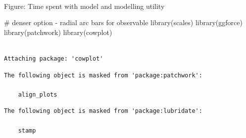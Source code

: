 \documentclass[
  letterpaper,
  DIV=11,
  numbers=noendperiod]{scrartcl}
\makeatletter
\let\oldparagraph\paragraph
\renewcommand{\paragraph}{
    \@ifstar
      \xxxParagraphStar
      \xxxParagraphNoStar
  }
\newcommand{\xxxParagraphStar}[1]{\oldparagraph*{#1}\mbox{}}
\newcommand{\xxxParagraphNoStar}[1]{\oldparagraph{#1}\mbox{}}
\newenvironment{Shaded}{\begin{snugshade}}{\end{snugshade}}
\newcommand{\CommentTok}[1]{\textcolor[rgb]{0.37,0.37,0.37}{#1}}
\newcommand{\FunctionTok}[1]{\textcolor[rgb]{0.28,0.35,0.67}{#1}}
\newcommand{\NormalTok}[1]{\textcolor[rgb]{0.00,0.23,0.31}{#1}}
\makeatother
\begin{document}
\paragraph{Figure: Time spent with model and modelling
utility}\label{figure-time-spent-with-model-and-modelling-utility}

\begin{Shaded}
\begin{Highlighting}[]
\CommentTok{\# denser option {-} radial arc bars for observable}
\FunctionTok{library}\NormalTok{(scales)}
\FunctionTok{library}\NormalTok{(ggforce)}
\FunctionTok{library}\NormalTok{(patchwork)}
\FunctionTok{library}\NormalTok{(cowplot)}
\end{Highlighting}
\end{Shaded}

\begin{verbatim}

Attaching package: 'cowplot'
\end{verbatim}

\begin{verbatim}
The following object is masked from 'package:patchwork':

    align_plots
\end{verbatim}

\begin{verbatim}
The following object is masked from 'package:lubridate':

    stamp
\end{verbatim}
\end{document}
